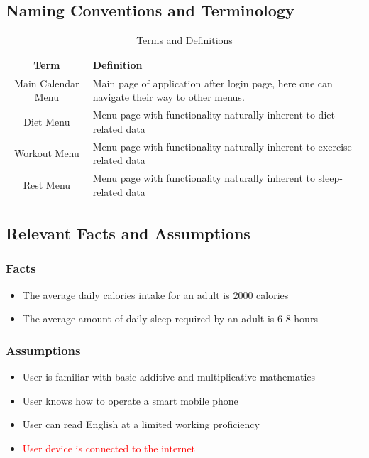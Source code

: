 \documentclass[12pt,letterpaper]{article}
\begin{document}
\subsection{Naming Conventions and Terminology}
\label{sub:Naming Conventions and Terminology}
\begin{table}[H]
	\caption{Terms and Definitions}
	\centering
	\begin{tabular}{|c|p{10cm}|}
		\hline
		\textbf{Term} & \textbf{Definition}\\
		\hline
		Main Calendar Menu & Main page of application after login page, here one can navigate their way to other menus.\\
		\hline
		Diet Menu & Menu page with functionality naturally inherent to diet-related data\\
		\hline
		Workout Menu & Menu page with functionality naturally inherent to exercise-related data\\
		\hline
		Rest Menu &Menu page with functionality naturally inherent to sleep-related data\\
		\hline
	\end{tabular}
\end{table}


\subsection{Relevant Facts and Assumptions}
\subsubsection{Facts}
\begin{itemize}
	\item The average daily calories intake for an adult is 2000 calories
	\item The average amount of daily sleep required by an adult is 6-8 hours
\end{itemize}

\subsubsection{Assumptions}
\begin{itemize}
	\item User is familiar with basic additive and multiplicative mathematics
	\item User knows how to operate a smart mobile phone
	\item User can read English at a limited working proficiency
	\item {\textcolor{red}{User device is connected to the internet}}
\end{itemize}
\end{document}
